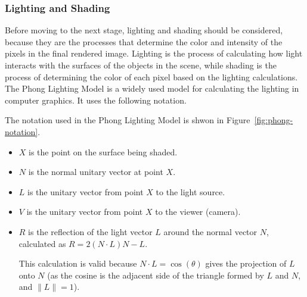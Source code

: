 \subsubsection{Lighting and Shading}

Before moving to the next stage, lighting and shading should be considered, because they are the processes that determine the color and intensity of the pixels in the final rendered image. Lighting is the process of calculating how light interacts with the surfaces of the objects in the scene, while shading is the process of determining the color of each pixel based on the lighting calculations. The Phong Lighting Model is a widely used model for calculating the lighting in computer graphics. It uses the following notation.
\begin{notacion}
The notation used in the Phong Lighting Model is shwon in Figure~\ref{fig:phong-notation}.
\begin{itemize}
    \item $X$ is the point on the surface being shaded.
    \item $N$ is the normal unitary vector at point $X$.
    \item $L$ is the unitary vector from point $X$ to the light source.
    \item $V$ is the unitary vector from point $X$ to the viewer (camera).
    \item $R$ is the reflection of the light vector $L$ around the normal vector $N$, calculated as $R = 2(N \cdot L)N - L$.
    
    This calculation is valid because $N\cdot L=\cos (\theta)$ gives the projection of $L$ onto $N$ (as the cosine is the adjacent side of the triangle formed by $L$ and $N$, and $\|L\|=1$).
\end{itemize}
\begin{figure}
    \centering
\end{figure}
\end{notacion}
